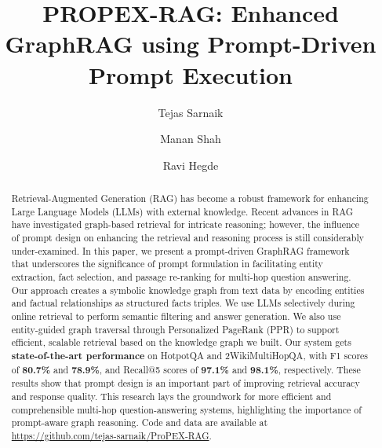 \documentclass[runningheads]{llncs}
\begin{document}
%
\title{PROPEX-RAG: Enhanced GraphRAG using Prompt-Driven Prompt Execution}


%
%
\author{Tejas Sarnaik \and
Manan Shah \and
Ravi Hegde}
%
%
%

\maketitle              %
%
\begin{abstract}
\justifying
Retrieval-Augmented Generation (RAG) has become a robust framework for enhancing Large Language Models (LLMs) with external knowledge. Recent advances in RAG have investigated graph-based retrieval for intricate reasoning; however, the influence of prompt design on enhancing the retrieval and reasoning process is still considerably under-examined. In this paper, we present a prompt-driven GraphRAG framework that underscores the significance of prompt formulation in facilitating entity extraction, fact selection, and passage re-ranking for multi-hop question answering. Our approach creates a symbolic knowledge graph from text data by encoding entities and factual relationships as structured facts triples. We use LLMs selectively during online retrieval to perform semantic filtering and answer generation. We also use entity-guided graph traversal through Personalized PageRank (PPR) to support efficient, scalable retrieval based on the knowledge graph we built. Our system gets \textbf{state-of-the-art performance} on HotpotQA and 2WikiMultiHopQA, with F1 scores of \textbf{80.7\%} and \textbf{78.9\%}, and Recall@5 scores of \textbf{97.1\%} and \textbf{98.1\%}, respectively. These results show that prompt design is an important part of improving retrieval accuracy and response quality. This research lays the groundwork for more efficient and comprehensible multi-hop question-answering systems, highlighting the importance of prompt-aware graph reasoning. Code and data are available at \href{https://github.com/tejas-sarnaik/ProPEX-RAG}{https://github.com/tejas-sarnaik/ProPEX-RAG}.


\end{abstract}
%
%
%
\end{document}
